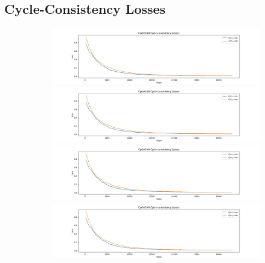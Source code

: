 \documentclass[12pt, fleqn, titlepage]{article}
\begin{document}
\subsection{Cycle-Consistency Losses}\label{cycle_loss}
\begin{figure}[H]
	\centering
	\begin{subfigure}[b]{0.8\textwidth}
		\centering
		\includegraphics[width=\linewidth]{imgs/placeholder_cycle_losses}
		\hfill
		\includegraphics[width=\linewidth]{imgs/placeholder_cycle_losses}
		\hfill
		\includegraphics[width=\linewidth]{imgs/placeholder_cycle_losses}
		\hfill
		\includegraphics[width=\linewidth]{imgs/placeholder_cycle_losses}
	\end{subfigure}
\end{figure}
\end{document}
